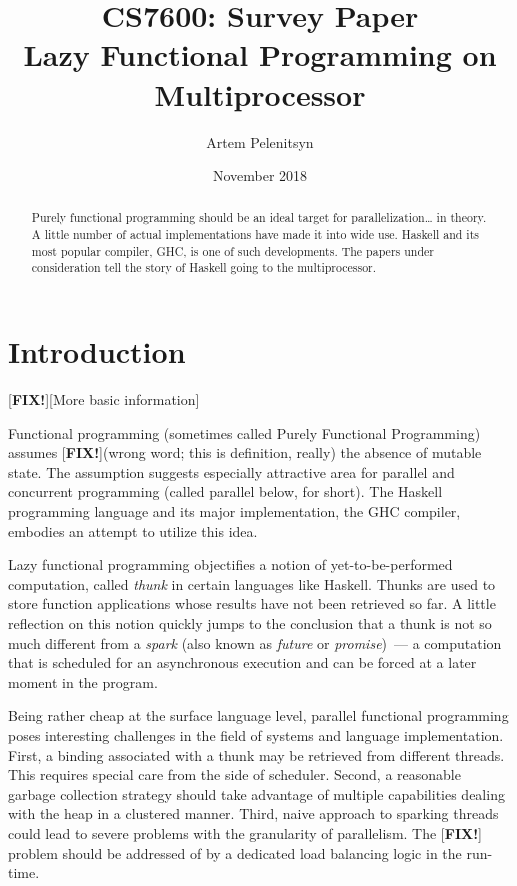 \documentclass[11pt]{extarticle}
\title{CS7600: Survey Paper\\Lazy Functional Programming on Multiprocessor}
\author{Artem Pelenitsyn}
\date{November 2018}
\newcommand{\fix}{[{\color{red}\bf FIX!}]\xspace}
\begin{document}
\maketitle

\begin{abstract}
Purely functional programming should be an ideal target for parallelization… in theory. A little number of actual implementations have made it into wide use. Haskell and its most popular compiler, GHC, is one of such developments. The papers under consideration tell the story of Haskell going to the multiprocessor.
\end{abstract}


\nocite{*}



\section{Introduction}

\fix [More basic information]

Functional programming (sometimes called Purely Functional Programming) assumes \fix (wrong word; this is definition, really) the absence of mutable state. The assumption suggests especially attractive area for parallel and concurrent programming (called parallel below, for short). The Haskell programming language and its major implementation, the GHC compiler, embodies an attempt to utilize this idea.

Lazy functional programming objectifies a notion of yet-to-be-performed computation, called \emph{thunk} in certain languages like Haskell. Thunks are used to store function applications whose results have not been retrieved so far. A little reflection on this notion quickly jumps to the conclusion that a thunk is not so much different from a \emph{spark} (also known as \emph{future} or \emph{promise})~--- a computation that is scheduled for an asynchronous execution and can be forced at a later moment in the program.

Being rather cheap at the surface language level, parallel functional programming poses interesting challenges in the field of systems and language implementation. First, a binding associated with a thunk may be retrieved from different threads. This requires special care from the side of scheduler. Second, a reasonable garbage collection strategy should take advantage of multiple capabilities dealing with the heap in a clustered manner. Third, naive approach to sparking threads could lead to severe problems with the granularity of parallelism. The \fix problem should be addressed of by a dedicated load balancing logic in the run-time.
\end{document}
